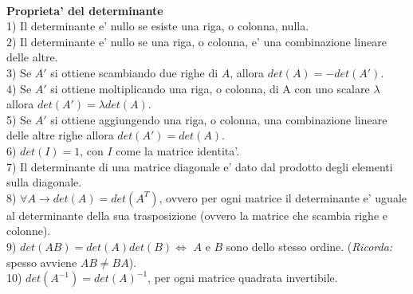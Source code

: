 \documentclass{article}
\begin{document}
\vspace{3em}
\textbf{\\Proprieta' del determinante}
\\1) Il determinante e' nullo se esiste una riga, o colonna, nulla.
\\2) Il determinante e' nullo se una riga, o colonna, e' una combinazione lineare delle altre.
\\3) Se $A'$ si ottiene scambiando due righe di $A$, allora $det(A)=-det(A')$.
\\4) Se $A'$ si ottiene moltiplicando una riga, o colonna, di A con uno scalare $\lambda$ allora $det(A')=\lambda det(A)$.
\\5) Se $A'$ si ottiene aggiungendo una riga, o colonna, una combinazione lineare delle altre righe allora $det(A')=det(A)$.
\\6) $det(I)=1$, con $I$ come la matrice identita'.
\\7) Il determinante di una matrice diagonale e' dato dal prodotto degli elementi sulla diagonale.
\\8) $\forall A \to det(A)=det(A^T)$, ovvero per ogni matrice il determinante e' uguale al determinante della sua trasposizione (ovvero la matrice che scambia righe e colonne).
\\9) $det(AB)=det(A)det(B) \iff $ $A$ e $B$ sono dello stesso ordine. (\textit{Ricorda: } spesso avviene $AB\neq BA$).
\\10) $det(A^{-1})=det(A)^{-1}$, per ogni matrice quadrata invertibile.


\pagebreak
\end{document}
